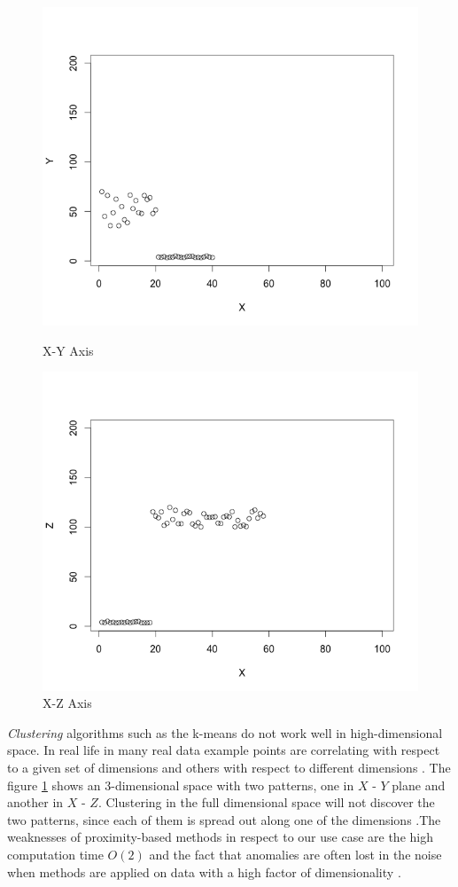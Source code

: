 \begin{figure}
\centering
    \includegraphics[scale=0.4]{Graphics/plottA.png}
\caption{ X-Y Axis}
 \includegraphics[scale=0.4]{Graphics/plottb.png}
 \caption{ X-Z Axis }
\label{fig:clustering_dimensions}
\end{figure}

\textit{Clustering} algorithms such as the k-means do not work well in high-dimensional space. In  real life in many real data example points are correlating with respect to a given set of dimensions and others with respect to different dimensions \cite{Aggarwal:1999:FAP:304181.304188}. The figure \ref{fig:clustering_dimensions} shows an 3-dimensional space with two patterns, one in \(X\) - \(Y\) plane and another in \(X\) - \(Z\). Clustering in the full dimensional space will not discover the two patterns, since each of them is spread out along one of the dimensions \cite{Aggarwal:1999:FAP:304181.304188}.The weaknesses of proximity-based methods in respect to our use case are the high computation time \(O(2)\) and the fact that anomalies are often lost in the noise when methods are applied on data with a high factor of dimensionality \cite{Aggarwal:2013}.

